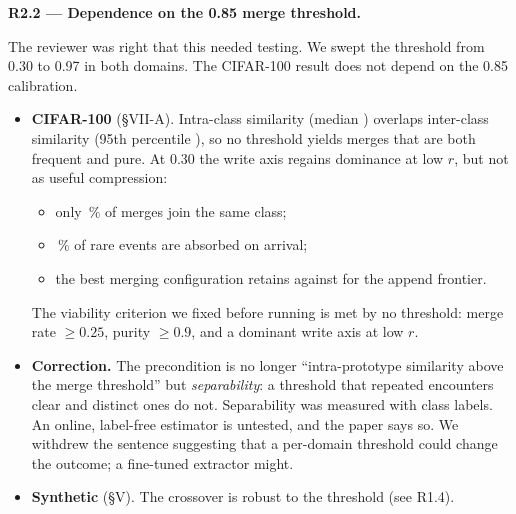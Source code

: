 \documentclass[11pt]{article}
\newcommand{\comment}[1]{\par\medskip\noindent\textbf{#1}\par}
\begin{document}
\comment{R2.2 --- Dependence on the 0.85 merge threshold.}
The reviewer was right that this needed testing. We swept the threshold from
0.30 to 0.97 in both domains. The CIFAR-100 result does not depend on the 0.85
calibration.
\begin{itemize}
\item \textbf{CIFAR-100} (§VII-A). Intra-class similarity (median
)
overlaps inter-class similarity (95th percentile
),
so no threshold yields merges that are both frequent and pure. At 0.30 the
write axis regains dominance at low $r$, but not as useful compression:
\begin{itemize}
\item only \,\%
of merges join the same class;
\item {}\,\%
of rare events are absorbed on arrival;
\item the best merging configuration retains
against
for the append frontier.
\end{itemize}
The viability criterion we fixed before running is met by no threshold: merge
rate $\geq 0.25$, purity $\geq 0.9$, and a dominant write axis at low $r$.
\item \textbf{Correction.} The precondition is no longer ``intra-prototype
similarity above the merge threshold'' but \emph{separability}: a threshold
that repeated encounters clear and distinct ones do not. Separability was
measured with class labels. An online, label-free estimator is untested, and
the paper says so. We withdrew the sentence suggesting that a per-domain
threshold could change the outcome; a fine-tuned extractor might.
\item \textbf{Synthetic} (§V). The crossover is robust to the threshold (see
R1.4).
\end{itemize}
\end{document}
